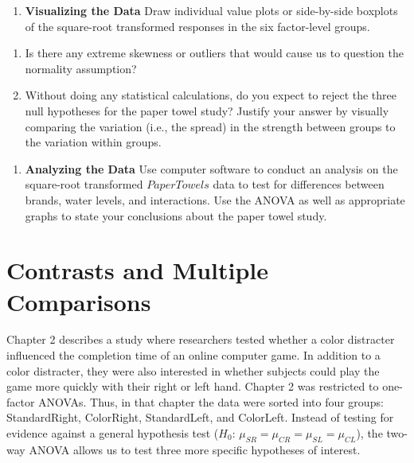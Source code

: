 \documentclass[
]{book}
\providecommand{\tightlist}{%
  \setlength{\itemsep}{0pt}\setlength{\parskip}{0pt}}
\begin{document}
\begin{enumerate}
\def\labelenumi{\arabic{enumi}.}
\setcounter{enumi}{34}
\tightlist
\item
  \textbf{Visualizing the Data} Draw individual value plots or side-by-side boxplots of the square-root transformed responses in the six factor-level groups.
\end{enumerate}

\begin{enumerate}
\def\labelenumi{\alph{enumi}.}
\tightlist
\item
  Is there any extreme skewness or outliers that would cause us to question the normality assumption?
\item
  Without doing any statistical calculations, do you expect to reject the three null hypotheses for the paper towel study? Justify your answer by visually comparing the variation (i.e., the spread) in the strength between groups to the variation within groups.
\end{enumerate}

\begin{enumerate}
\def\labelenumi{\arabic{enumi}.}
\setcounter{enumi}{35}
\tightlist
\item
  \textbf{Analyzing the Data} Use computer software to conduct an analysis on the square-root transformed \(PaperTowels\) data to test for differences between brands, water levels, and interactions. Use the ANOVA as well as appropriate graphs to state your conclusions about the paper towel study.
\end{enumerate}

\hypertarget{contrasts-and-multiple-comparisons}{%
\section{Contrasts and Multiple Comparisons}\label{contrasts-and-multiple-comparisons}}

Chapter 2 describes a study where researchers tested whether a color distracter influenced the completion time of an online computer game. In addition to a color distracter, they were also interested in whether subjects could play the game more quickly with their right or left hand. Chapter 2 was restricted to one-factor ANOVAs. Thus, in that chapter the data were sorted into four groups: StandardRight, ColorRight, StandardLeft, and ColorLeft. Instead of testing for evidence against a general hypothesis test (\(H_0\): \(\mu_{SR} = \mu_{CR} = \mu_{SL} = \mu_{CL}\)), the two-way ANOVA allows us to test three more specific hypotheses of interest.
\end{document}
